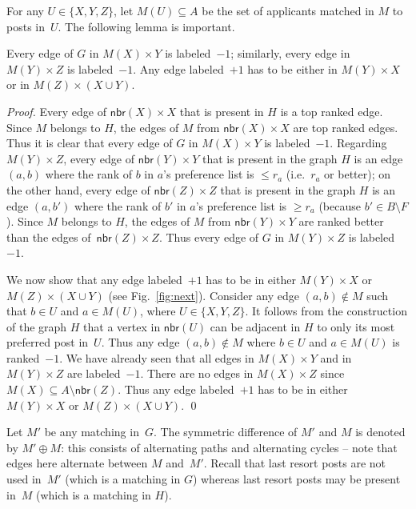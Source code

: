 \documentclass[11pt]{llncs}
\newcommand{\Nbr}{\mathsf{nbr}}
\begin{document}
For any $U \in \{X, Y, Z\}$, let $M(U) \subseteq A$ be the set of applicants matched in $M$ 
to posts in~$U$. The following lemma is important. 

\begin{lemma}
\label{lem:edge-signs}
Every edge of $G$ in $M(X) \times Y$ is labeled~$-1$; similarly, every edge in $M(Y) \times Z$ 
is labeled~$-1$. Any edge labeled~$+1$ has to be either in $M(Y) \times X$ or in 
$M(Z) \times (X \cup Y)$.
\end{lemma}
\begin{proof}
Every edge of $\Nbr(X)\times X$ that is present in $H$ is a top ranked edge. Since 
$M$ belongs to $H$, the edges of $M$ from $\Nbr(X)\times X$ are top ranked edges. Thus it is 
clear that every edge of $G$ in $M(X) \times Y$ is labeled~$-1$. Regarding $M(Y) \times Z$, 
every edge of $\Nbr(Y) \times Y$ that is present in the graph $H$ is an edge $(a,b)$ where the 
rank of $b$ in $a$'s preference list is $\le r_a$ (i.e.\ $r_a$ or better); on the other hand, 
every edge of $\Nbr(Z) \times Z$ that is present in the graph $H$ is an edge $(a,b')$ 
where the rank of $b'$ in $a$'s preference list is $\ge r_a$ (because $b' \in B\setminus F$). 
Since $M$ belongs to $H$, the edges of $M$ from $\Nbr(Y)\times Y$ are ranked better than the edges 
of~$\Nbr(Z) \times Z$. Thus every edge of $G$ in $M(Y) \times Z$ is labeled~$-1$.

We now show that any edge labeled~$+1$ has to be in either  $M(Y) \times X$ or
$M(Z) \times (X \cup Y)$ (see Fig.~\ref{fig:next}). Consider any edge $(a,b) \notin M$ 
such that $b \in U$ and $a \in M(U)$, where $U \in \{X, Y, Z\}$. It follows from the 
construction of the graph $H$ that a vertex in $\Nbr(U)$ can be adjacent in $H$ to only its most 
preferred post in~$U$. Thus any edge $(a,b) \notin M$ where $b \in U$ and $a \in M(U)$ is 
ranked~$-1$. We have already seen that all edges in $M(X) \times Y$ and in $M(Y) \times Z$ are 
labeled~$-1$. There are no edges in $M(X) \times Z$ since $M(X) \subseteq A \setminus \Nbr(Z)$. 
Thus any edge labeled~$+1$ has to be in either  $M(Y) \times X$ or $M(Z) \times (X \cup Y)$. \qed
\end{proof}



Let $M'$ be any matching in~$G$. The symmetric difference of $M'$ and $M$ is denoted by 
$M' \oplus M$: this consists of alternating paths and alternating cycles -- note that
edges here alternate between $M$ and~$M'$. 
Recall that last resort posts are not used in~$M'$ (which is a matching in $G$) 
whereas last resort posts may be present in~$M$ (which is a matching in $H$). 
\end{document}

